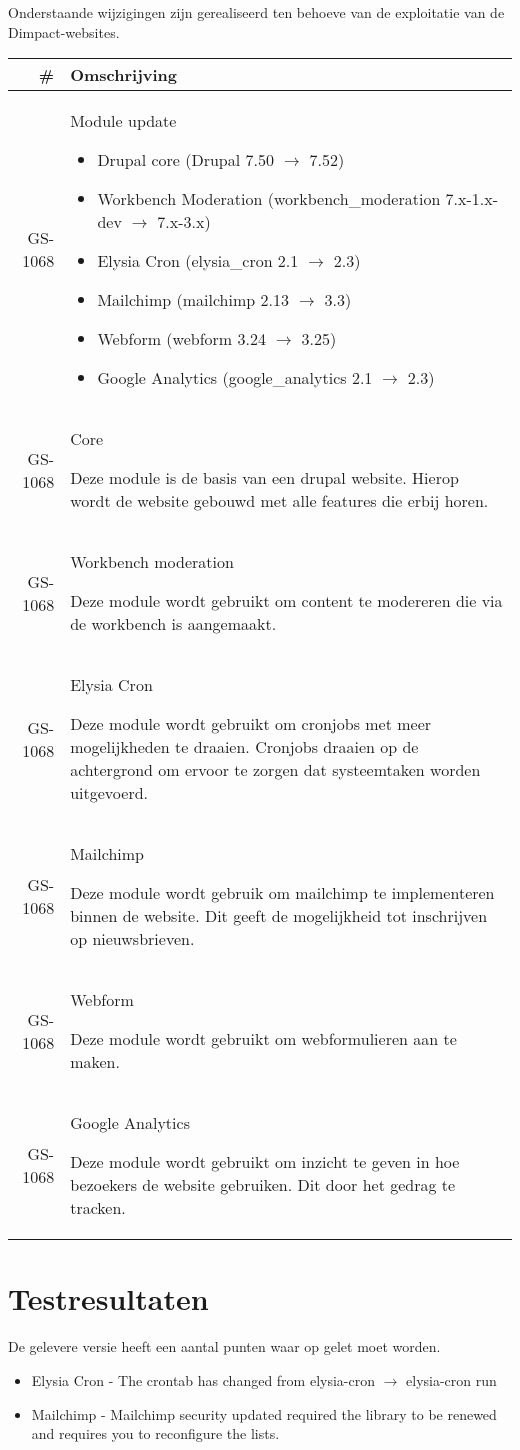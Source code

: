 \documentclass[12pt]{article}
\begin{document}
Onderstaande wijzigingen zijn gerealiseerd ten behoeve van de exploitatie van de Dimpact-websites.

\begin{tabular}{| r | p{15cm} |}
  \hline \# & Omschrijving \\ \hline
  GS-1068 & Module update
  \begin{itemize}
    \item Drupal core (Drupal 7.50 $\rightarrow$ 7.52)
    \item Workbench Moderation (workbench\_moderation 7.x-1.x-dev $\rightarrow$ 7.x-3.x)
    \item Elysia Cron (elysia\_cron 2.1 $\rightarrow$ 2.3)
    \item Mailchimp (mailchimp 2.13 $\rightarrow$ 3.3)
    \item Webform (webform 3.24 $\rightarrow$ 3.25)
    \item Google Analytics (google\_analytics 2.1 $\rightarrow$ 2.3)
  \end{itemize} \\ \hline
  GS-1068 & Core

  Deze module is de basis van een drupal website. Hierop wordt de website gebouwd met alle features die erbij horen. \\ \hline
  GS-1068 & Workbench moderation

  Deze module wordt gebruikt om content te modereren die via de workbench is aangemaakt. \\ \hline
  GS-1068 & Elysia Cron

  Deze module wordt gebruikt om cronjobs met meer mogelijkheden te draaien. Cronjobs draaien op de achtergrond om ervoor te zorgen dat systeemtaken worden uitgevoerd. \\ \hline
  GS-1068 & Mailchimp

  Deze module wordt gebruik om mailchimp te implementeren binnen de website. Dit geeft de mogelijkheid tot inschrijven op nieuwsbrieven. \\ \hline
  GS-1068 & Webform

  Deze module wordt gebruikt om webformulieren aan te maken. \\ \hline
  GS-1068 & Google Analytics

  Deze module wordt gebruikt om inzicht te geven in hoe bezoekers de website gebruiken. Dit door het gedrag te tracken. \\ \hline
\end{tabular}

\section{Testresultaten}
  De gelevere versie heeft een aantal punten waar op gelet moet worden.
  \begin{itemize}
    \item Elysia Cron - The crontab has changed from elysia-cron $\rightarrow$ elysia-cron run
    \item Mailchimp - Mailchimp security updated required the library to be renewed and requires you to reconfigure the lists.
  \end{itemize}
\end{document}
